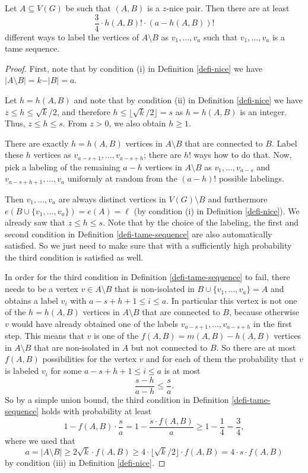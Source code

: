 \begin{claim}\label{claim-count-labelings} Let $A\subseteq V(G)$ be such that $(A,B)$ is a $z$-nice pair. Then there are at least
\[\frac{3}{4}\cdot  h(A,B)!\cdot (a-h(A,B))!\]
different ways to  label the vertices of $A\setminus B$ as $v_1,\dots,v_a$ such that $v_1,\dots,v_a$ is a tame sequence.
\end{claim}
\begin{proof}First, note that by condition (i) in Definition \ref{defi-nice} we have $\vert A\setminus B\vert=k-\vert B\vert=a$.

Let $h=h(A,B)$ and note that by condition (ii) in Definition \ref{defi-nice} we have $z\leq h\leq \sqrt{k}/2$, and therefore $h\leq \lfloor \sqrt{k}/2\rfloor=s$ as $h=h(A,B)$ is an integer. Thus, $z\leq h\leq s$. From $z>0$, we also obtain $h\geq 1$. 

There are exactly $h=h(A,B)$ vertices in $A\setminus B$ that are connected to $B$. Label these $h$ vertices as $v_{a-s+1},\dots,v_{a-s+h}$; there are $h!$ ways how to do that. Now, pick a labeling of the remaining $a-h$ vertices in $A\setminus B$ as $v_1,\dots,v_{a-s}$ and $v_{a-s+h+1},\dots,v_a$ uniformly at random from the $(a-h)!$ possible labelings.

Then $v_1,\dots,v_a$ are always distinct vertices in $V(G)\setminus B$ and furthermore $e(B\cup \lbrace v_1,\dots,v_a\rbrace)=e(A)=\ell$ (by condition (i) in Definition \ref{defi-nice}). We already saw that $z\leq h\leq s$. Note that by the choice of the labeling, the first and second condition in Definition \ref{defi-tame-sequence} are also automatically satisfied. So we just need to make sure that with a sufficiently high probability the third condition is satisfied as well.

In order for the third condition in Definition \ref{defi-tame-sequence} to fail, there needs to be a vertex $v\in A\setminus B$ that is non-isolated in $B\cup \lbrace v_1,\dots,v_a\rbrace=A$ and obtains a label $v_i$ with $a-s+h+1\leq i\leq a$. In particular this vertex is not one of the $h=h(A,B)$ vertices in $A\setminus B$ that are connected to $B$, because otherwise $v$ would have already obtained one of the labels $v_{a-s+1},\dots,v_{a-s+h}$ in the first step. This means that $v$ is one of the $f(A,B)=m(A,B)-h(A,B)$ vertices in $A\setminus B$ that are non-isolated in $A$ but not connected to $B$. So there are at most $f(A,B)$ possibilities for the vertex $v$ and for each of them the probability that $v$ is labeled $v_i$ for some $a-s+h+1\leq i\leq a$ is at most
\[\frac{s-h}{a-h}\leq \frac{s}{a}.\]
So by a simple union bound, the third condition in Definition \ref{defi-tame-sequence} holds with probability at least
\[1-f(A,B)\cdot \frac{s}{a}= 1-\frac{s\cdot f(A,B)}{a}\geq 1-\frac{1}{4}=\frac{3}{4},\]
where we used that
\[a=\vert A\setminus B\vert \geq  2\sqrt{k}\cdot f(A,B)\geq 4\cdot \lfloor\sqrt{k}/2\rfloor\cdot f(A,B)=4\cdot s\cdot f(A,B)\]
by condition (iii) in Definition \ref{defi-nice}.


\end{proof}
